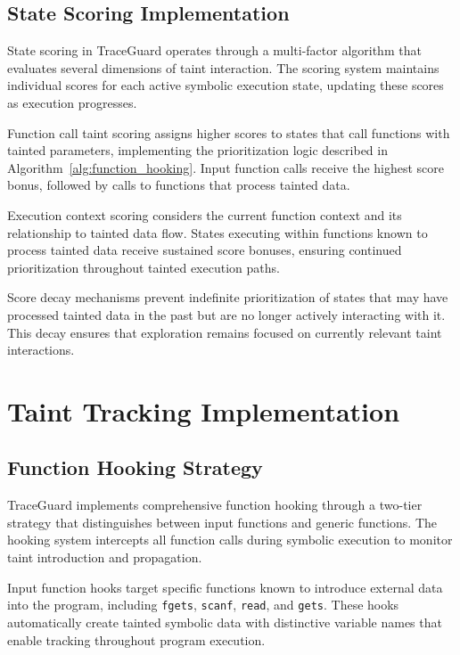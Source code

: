 \subsection{State Scoring Implementation}

State scoring in TraceGuard operates through a multi-factor algorithm that evaluates several dimensions of taint interaction. The scoring system maintains individual scores for each active symbolic execution state, updating these scores as execution progresses.

Function call taint scoring assigns higher scores to states that call functions with tainted parameters, implementing the prioritization logic described in Algorithm~\ref{alg:function_hooking}. Input function calls receive the highest score bonus, followed by calls to functions that process tainted data.

Execution context scoring considers the current function context and its relationship to tainted data flow. States executing within functions known to process tainted data receive sustained score bonuses, ensuring continued prioritization throughout tainted execution paths.

Score decay mechanisms prevent indefinite prioritization of states that may have processed tainted data in the past but are no longer actively interacting with it. This decay ensures that exploration remains focused on currently relevant taint interactions.

\section{Taint Tracking Implementation}\label{sec:taint_tracking_implementation}

\subsection{Function Hooking Strategy}

TraceGuard implements comprehensive function hooking through a two-tier strategy that distinguishes between input functions and generic functions. The hooking system intercepts all function calls during symbolic execution to monitor taint introduction and propagation.

Input function hooks target specific functions known to introduce external data into the program, including \texttt{fgets}, \texttt{scanf}, \texttt{read}, and \texttt{gets}. These hooks automatically create tainted symbolic data with distinctive variable names that enable tracking throughout program execution.

